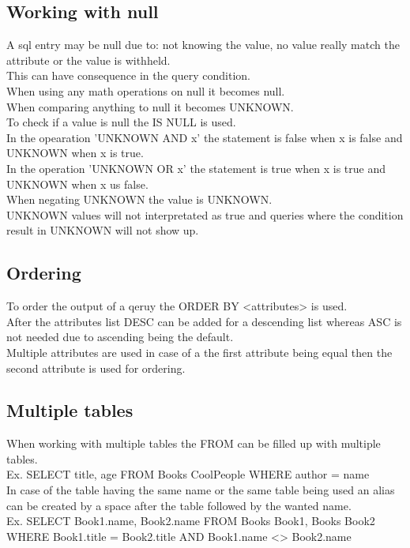 \documentclass[12pt, a4paper]{article}
\begin{document}
		\subsection{Working with null}
			A sql entry may be null due to: not knowing the value, no value really match the attribute or the value is withheld.\\
			This can have consequence in the query condition.\\
			When using any math operations on null it becomes null.\\
			When comparing anything to null it becomes UNKNOWN.\\
			To check if a value is null the IS NULL is used.\\
			In the opearation 'UNKNOWN AND x' the statement is false when x is false and UNKNOWN when x is true.\\
			In the operation 'UNKNOWN OR x' the statement is true when x is true and UNKNOWN when x us false.\\
			When negating UNKNOWN the value is UNKNOWN.\\
			UNKNOWN values will not interpretated as true and queries where the condition result in UNKNOWN will not show up.\\
		\subsection{Ordering}
			To order the output of a qeruy the ORDER BY <attributes> is used.\\
			After the attributes list DESC can be added for a descending list whereas ASC is not needed due to ascending being the default.\\
			Multiple attributes are used in case of a the first attribute being equal then the second attribute is used for ordering.
		\subsection{Multiple tables}
			When working with multiple tables the FROM can be filled up with multiple tables.\\
			Ex. SELECT title, age FROM Books CoolPeople WHERE author = name\\
			In case of the table having the same name or the same table being used an alias can be created by a space after the table followed by the wanted name.\\
			Ex. SELECT Book1.name, Book2.name FROM Books Book1, Books Book2 WHERE Book1.title = Book2.title AND Book1.name <> Book2.name\\
\end{document}
